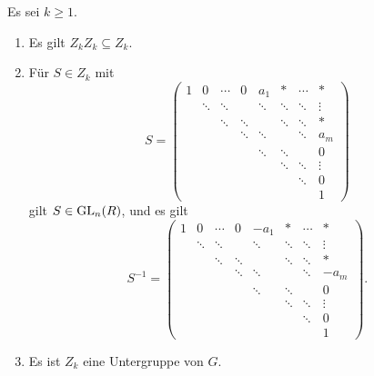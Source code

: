 \begin{corollary}
  \label{corollary: is a subgroup}
  Es sei $k \geq 1$.
  \begin{enumerate}
    \item
      Es gilt $Z_k Z_k \subseteq Z_k$.
    \item
      Für $S \in Z_k$ mit
      \[
          S
        = \begin{pmatrix}
            1 & 0       & \cdots  &       0 & a_1     & *       & \cdots  & *       \\
              & \ddots  & \ddots  &         & \ddots  & \ddots  & \ddots  & \vdots  \\
              &         & \ddots  & \ddots  &         & \ddots  & \ddots  & *       \\
              &         &         & \ddots  & \ddots  &         & \ddots  & a_m     \\
              &         &         &         & \ddots  & \ddots  &         & 0       \\
              &         &         &         &         & \ddots  & \ddots  & \vdots  \\
              &         &         &         &         &         & \ddots  & 0       \\
              &         &         &         &         &         &         & 1
          \end{pmatrix}
      \]
      gilt $S \in \operatorname{GL}_{n}(R)$, und es gilt
      \[
          S^{-1}
        = \begin{pmatrix}
            1 & 0       & \cdots  &       0 & -a_1    & *       & \cdots  & *       \\
              & \ddots  & \ddots  &         & \ddots  & \ddots  & \ddots  & \vdots  \\
              &         & \ddots  & \ddots  &         & \ddots  & \ddots  & *       \\
              &         &         & \ddots  & \ddots  &         & \ddots  & -a_m    \\
              &         &         &         & \ddots  & \ddots  &         & 0       \\
              &         &         &         &         & \ddots  & \ddots  & \vdots  \\
              &         &         &         &         &         & \ddots  & 0       \\
              &         &         &         &         &         &         & 1
          \end{pmatrix}.
      \]
    \item
      Es ist $Z_k$ eine Untergruppe von $G$.
  \end{enumerate}
\end{corollary}


